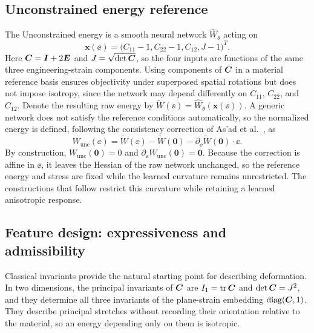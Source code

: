 \subsection{Unconstrained energy reference}
\label{sec:tiers}
The Unconstrained energy is a smooth neural network $\widehat W_{\theta}$ acting on
\begin{equation}
 \bm x(\ee)=\big(C_{11}-1,C_{22}-1,C_{12},J-1\big)^T.
 \label{eq:unconstrained_inputs}
\end{equation}
Here $\bm C=\bm I+2\bm E$ and $J=\sqrt{\det\bm C}$, so the four inputs are functions of the same three engineering-strain components. Using components of $\bm C$ in a material reference basis ensures objectivity under superposed spatial rotations but does not impose isotropy, since the network may depend differently on $C_{11}$, $C_{22}$, and $C_{12}$. Denote the resulting raw energy by $\widetilde W(\ee)=\widehat W_{\theta}(\bm x(\ee))$. A generic network does not satisfy the reference conditions automatically, so the normalized energy is defined, following the consistency correction of As'ad et al.~\cite{asad2022}, as
\begin{equation}
 W_{\mathrm{unc}}(\ee)=\widetilde W(\ee)-\widetilde W(\bm0)
 -\partial_{\ee}\widetilde W(\bm0)\cdot\ee.
 \label{eq:unconstrained_energy}
\end{equation}
By construction, $W_{\mathrm{unc}}(\bm0)=0$ and $\partial_{\ee}W_{\mathrm{unc}}(\bm0)=\bm0$. Because the correction is affine in $\ee$, it leaves the Hessian of the raw network unchanged, so the reference energy and stress are fixed while the learned curvature remains unrestricted. The constructions that follow restrict this curvature while retaining a learned anisotropic response.

\subsection{Feature design: expressiveness and admissibility}
\label{sec:feature_order}
Classical invariants provide the natural starting point for describing deformation. In two dimensions, the principal invariants of $\bm C$ are $I_1=\operatorname{tr}\bm C$ and $\det\bm C=J^2$, and they determine all three invariants of the plane-strain embedding $\operatorname{diag}(\bm C,1)$. They describe principal stretches without recording their orientation relative to the material, so an energy depending only on them is isotropic.

